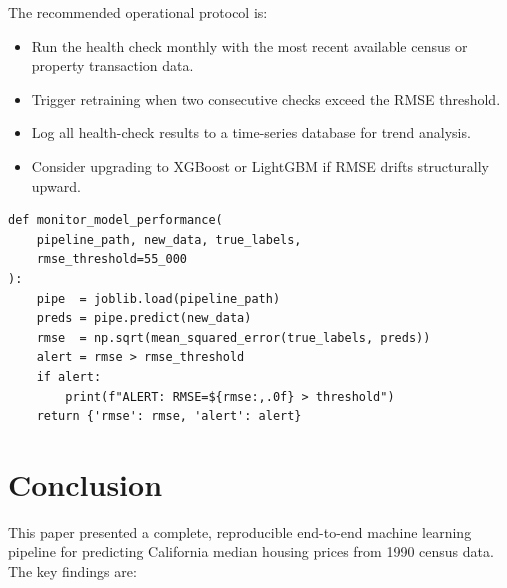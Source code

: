 \documentclass[conference]{IEEEtran}
\begin{document}
The recommended operational protocol is:
\begin{itemize}
    \item Run the health check monthly with the most recent available census or property transaction data.
    \item Trigger retraining when two consecutive checks exceed the RMSE threshold.
    \item Log all health-check results to a time-series database for trend analysis.
    \item Consider upgrading to XGBoost or LightGBM if RMSE drifts structurally upward.
\end{itemize}

\begin{lstlisting}[caption={Production monitoring stub}, label={lst:monitoring}]
def monitor_model_performance(
    pipeline_path, new_data, true_labels,
    rmse_threshold=55_000
):
    pipe  = joblib.load(pipeline_path)
    preds = pipe.predict(new_data)
    rmse  = np.sqrt(mean_squared_error(true_labels, preds))
    alert = rmse > rmse_threshold
    if alert:
        print(f"ALERT: RMSE=${rmse:,.0f} > threshold")
    return {'rmse': rmse, 'alert': alert}
\end{lstlisting}

\section{Conclusion}
\label{sec:conclusion}

This paper presented a complete, reproducible end-to-end machine learning pipeline for predicting California median housing prices from 1990 census data. The key findings are:
\end{document}
